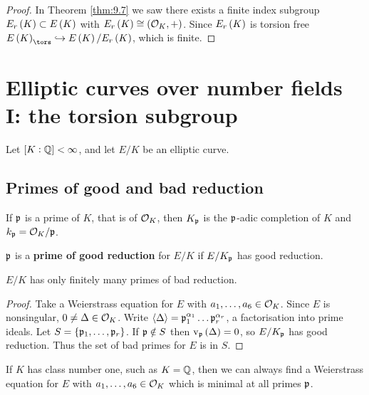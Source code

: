 \begin{proof}
In Theorem \ref{thm:9.7} we saw there exists a finite index subgroup $ E_r\br{K} \subset E\br{K} $ with $ E_r\br{K} \cong \br{\OOO_K, +} $. Since $ E_r\br{K} $ is torsion free $ E\br{K}_{\tors} \hookrightarrow E\br{K} / E_r\br{K} $, which is finite.
\end{proof}

\pagebreak

\section{Elliptic curves over number fields I: the torsion subgroup}

Let $ \sbr{K : \QQ} < \infty $, and let $ E / K $ be an elliptic curve.

\subsection{Primes of good and bad reduction}

\begin{notation*}
If $ \mathfrak{p} $ is a prime of $ K $, that is of $ \mathcal{O}_K $, then $ K_{\mathfrak{p}} $ is the $ \mathfrak{p} $-adic completion of $ K $ and $ k_{\mathfrak{p}} = \mathcal{O}_K / \mathfrak{p} $.
\end{notation*}

\begin{definition*}
$ \mathfrak{p} $ is a \textbf{prime of good reduction} for $ E / K $ if $ E / K_{\mathfrak{p}} $ has good reduction.
\end{definition*}

\begin{lemma}
$ E / K $ has only finitely many primes of bad reduction.
\end{lemma}

\begin{proof}
Take a Weierstrass equation for $ E $ with $ a_1, \dots, a_6 \in \mathcal{O}_K $. Since $ E $ is nonsingular, $ 0 \ne \Delta \in \mathcal{O}_K $. Write $ \left\langle \Delta \right\rangle = \mathfrak{p}_1^{\alpha_1} \dots \mathfrak{p}_r^{\alpha_r} $, a factorisation into prime ideals. Let $ S = \cbr{\ppp_1, \dots, \ppp_r} $. If $ \mathfrak{p} \notin S $ then $ \v_\ppp\br{\Delta} = 0 $, so $ E / K_{\mathfrak{p}} $ has good reduction. Thus the set of bad primes for $ E $ is in $ S $.
\end{proof}

\begin{remark*}
If $ K $ has class number one, such as $ K = \mathbb{Q} $, then we can always find a Weierstrass equation for $ E $ with $ a_1, \dots, a_6 \in \mathcal{O}_K $ which is minimal at all primes $ \mathfrak{p} $.
\end{remark*}

